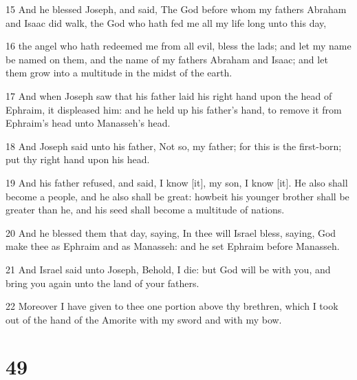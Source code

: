 \par 15 And he blessed Joseph, and said, The God before whom my fathers Abraham and Isaac did walk, the God who hath fed me all my life long unto this day,
\par 16 the angel who hath redeemed me from all evil, bless the lads; and let my name be named on them, and the name of my fathers Abraham and Isaac; and let them grow into a multitude in the midst of the earth.
\par 17 And when Joseph saw that his father laid his right hand upon the head of Ephraim, it displeased him: and he held up his father's hand, to remove it from Ephraim's head unto Manasseh's head.
\par 18 And Joseph said unto his father, Not so, my father; for this is the first-born; put thy right hand upon his head.
\par 19 And his father refused, and said, I know [it], my son, I know [it]. He also shall become a people, and he also shall be great: howbeit his younger brother shall be greater than he, and his seed shall become a multitude of nations.
\par 20 And he blessed them that day, saying, In thee will Israel bless, saying, God make thee as Ephraim and as Manasseh: and he set Ephraim before Manasseh.
\par 21 And Israel said unto Joseph, Behold, I die: but God will be with you, and bring you again unto the land of your fathers.
\par 22 Moreover I have given to thee one portion above thy brethren, which I took out of the hand of the Amorite with my sword and with my bow.

\chapter{49}

